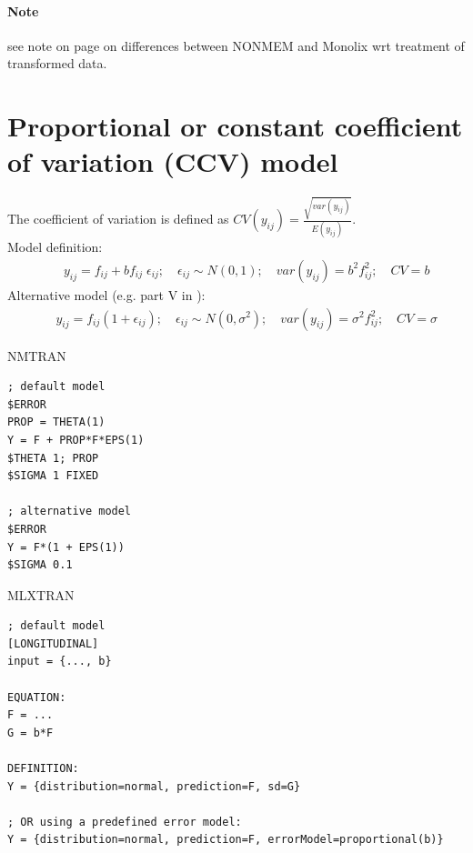 \paragraph{Note} see note on page \pageref{noteOnNM} on differences between NONMEM and Monolix
wrt treatment of transformed data.
\marginpar{\textcolor{red}{CHECK \\ powerNormal}}


\section{Proportional or constant coefficient of variation (CCV) model}
\label{model2}
The coefficient of variation is defined as $CV(y_{ij}) = \frac{\sqrt{\mathit{var}(y_{ij})}}{E(y_{ij})}$.\\
\smallskip
Model definition:
\begin{eqnarray}
&& y_{ij} =  f_{ij} + bf_{ij} \; \epsilon_{ij}; \quad \epsilon_{ij} \sim N(0,1); \quad \mathit{var}(y_{ij}) = b^2f_{ij}^2; \quad \mathit{CV} = b \nonumber
\end{eqnarray}
Alternative model (e.g. part V in \cite{NONMEM:2006aa}):
\begin{eqnarray}
&& y_{ij} =  f_{ij}(1+\epsilon_{ij}); \quad \epsilon_{ij} \sim N(0,\sigma^2); \quad
\mathit{var}(y_{ij}) =  \sigma^2 f_{ij}^2; \quad \mathit{CV} = \sigma \nonumber
\end{eqnarray}

\bigskip
\begin{lrbox}{\lstbox}\begin{minipage}{16cm}
NMTRAN
\begin{lstlisting}[frame=single,language=NM]
; default model
$ERROR
PROP = THETA(1)
Y = F + PROP*F*EPS(1)
$THETA 1; PROP
$SIGMA 1 FIXED

; alternative model
$ERROR
Y = F*(1 + EPS(1))
$SIGMA 0.1
\end{lstlisting}   
\end{minipage}\end{lrbox}
\usebox\lstbox


\begin{lrbox}{\lstbox}\begin{minipage}{16cm}
MLXTRAN
\begin{lstlisting}[frame=single,language=MLX]
; default model
[LONGITUDINAL]
input = {..., b}

EQUATION:
F = ...
G = b*F

DEFINITION:
Y = {distribution=normal, prediction=F, sd=G}

; OR using a predefined error model:
Y = {distribution=normal, prediction=F, errorModel=proportional(b)}
\end{lstlisting}   
\end{minipage}\end{lrbox}
\usebox\lstbox


